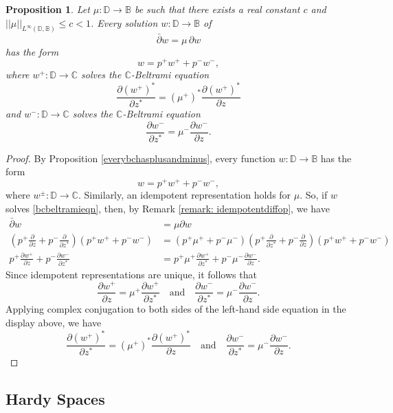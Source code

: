 \documentclass[12pt,reqno]{amsart}
\newtheorem{prop}[theorem]{Proposition}
\theoremstyle{definition}
\theoremstyle{remark}
\newcommand{\C}{\mathbb C}
\newcommand{\p}{\partial}
\newcommand{\dbar}{\bar\partial}
\newcommand{\bc}{\mathbb{B}}
\newcommand{\disk}{\mathbb{D}}
\begin{document}
\begin{prop}\label{prop: bcbelimpliescomplexbel}
    Let $\mu : \disk \to \bc$ be such that there exists a real constant $c$ and $||\mu||_{L^\infty(\disk,\bc)} \leq c < 1$. Every solution $w:\disk \to\bc$ of 
    \begin{equation}\label{bcbeltramieqn}
        \dbar w = \mu \, \p w
    \end{equation}
    has the form 
    \[
        w = p^+ w^+ + p^- w^-,
    \]
    where $w^+:\disk\to\mathbb{C}$ solves the $\mathbb{C}$-Beltrami equation
    \[
        \frac{\p (w^+)^*}{\p z^*} = (\mu^+)^* \frac{\p (w^+)^*}{\p z}
    \]
    and $w^- : \disk \to \mathbb{C}$ solves the $\mathbb{C}$-Beltrami equation
    \[
        \frac{\p w^-}{\p z^*} = \mu^- \frac{\p w^-}{\p z}.
    \]
\end{prop}

\begin{proof}
    By Proposition \ref{everybchasplusandminus}, every function $w:\disk\to\bc$ has the form 
    \[
        w = p^+ w^+ + p^- w^-,
    \]  
    where $w^\pm : \disk\to\C$. Similarly, an idempotent representation holds for $\mu$. So, if $w$ solves \eqref{bcbeltramieqn}, then, by  Remark \ref{remark: idempotentdiffop}, we have
    \begin{align*}
        \dbar w &= \mu \p w \\
        \left(p^+\frac{\p}{\p z} + p^- \frac{\p}{\p z^*}\right)(p^+w^+ + p^- w^-) &= (p^+\mu^+ + p^- \mu^-)  \left(p^+\frac{\p}{\p z^*} + p^- \frac{\p}{\p z}\right)(p^+w^+ + p^- w^-)\\
        p^+\frac{\p w^+}{\p z} + p^- \frac{\p w^-}{\p z^*} &= p^+ \mu^+ \frac{\p w^+}{\p z^*} + p^- \mu^- \frac{\p w^-}{\p z}.
    \end{align*}
    Since idempotent representations are unique, it follows that
    \[
        \frac{\p w^+}{\p z} = \mu^+ \frac{\p w^+}{\p z^*}
    \quad \text{and} \quad
        \frac{\p w^-}{\p z^*} = \mu^- \frac{\p w^-}{\p z}.
    \]
    Applying complex conjugation to both sides of the left-hand side equation in the display above, we have
    \[
        \frac{\p (w^+)^*}{\p z^*} = (\mu^+)^* \frac{\p (w^+)^*}{\p z}
    \quad \text{and} \quad
        \frac{\p w^-}{\p z^*} = \mu^- \frac{\p w^-}{\p z}.
    \]
\end{proof}

\subsection{Hardy Spaces}
\end{document}

